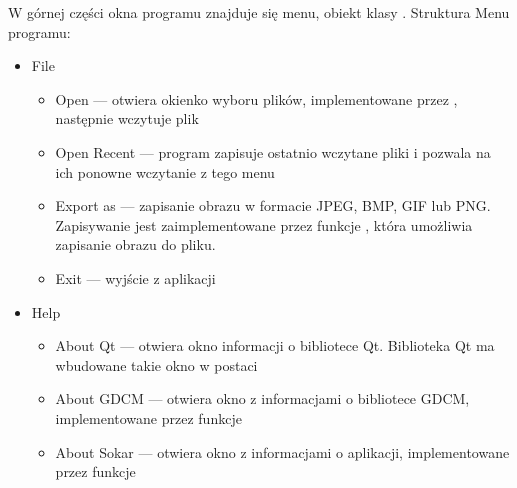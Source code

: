 \par
W górnej części okna programu znajduje się menu, obiekt klasy .
Struktura Menu programu:
\begin{itemize}
    \item File
          \begin{itemize}
              \item Open --- otwiera okienko wyboru plików, implementowane przez , następnie wczytuje plik
              \item Open Recent --- program zapisuje ostatnio wczytane pliki i pozwala na ich ponowne wczytanie z tego menu
              \item Export as --- zapisanie obrazu w formacie JPEG, BMP, GIF lub PNG.
                    Zapisywanie jest zaimplementowane przez funkcje , która umożliwia zapisanie obrazu do pliku.
              \item Exit --- wyjście z aplikacji
          \end{itemize}
    \item Help
          \begin{itemize}
              \item About Qt --- otwiera okno informacji o bibliotece Qt.
                    Biblioteka Qt ma wbudowane takie okno w postaci 
              \item About GDCM --- otwiera okno z informacjami o bibliotece GDCM, implementowane przez funkcje 
              \item About Sokar --- otwiera okno z informacjami o aplikacji, implementowane przez funkcje 
          \end{itemize}
\end{itemize}